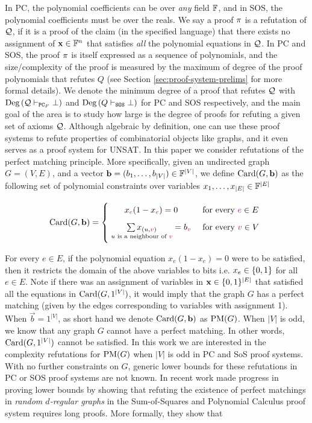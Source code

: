 \documentclass[11pt]{article}
\begin{document}
In PC, the polynomial coefficients can be over \emph{any} field $\mathbb{F}$, and in SOS, the polynomial coefficients must be over the reals.
We say a proof $\pi$ is a refutation of $\mathcal{Q}$, if it is a proof of the claim (in the specified language) that there exists no assignment of $\mathbf{x} \in \mathbb{F}^n$ that satisfies \emph{all} the polynomial equations in $\mathcal{Q}$. 
In PC and SOS, the proof $\pi$ is itself expressed as a sequence of polynomials, and 
the size/complexity of the proof is measured by the maximum of degree of the proof polynomials that refutes $Q$ (see Section \ref{sec:proof-system-prelims} for more formal details).
We denote the minimum degree of a proof that refutes $\mathcal{Q}$ with $\text{Deg}\left(\mathcal{Q} \vdash_{\texttt{PC}_F} \bot\right)$ and $\text{Deg}\left(Q \vdash_{\texttt{SOS}} \bot\right)$ for PC and SOS respectively, and the main goal of the area is to study how large is the degree of proofs for refuting a given set of axioms $\mathcal{Q}$.
Although algebraic by definition, one can use these proof systems to refute properties of combinatorial objects like graphs, and it even serves as a proof system for UNSAT.
In this paper we consider refutations of the perfect matching principle.
More specifically, given an undirected graph $G=(V,E)$, and a vector $\mathbf{b} = (b_1, \dots, b_{|V|})  \in \mathbb{F}^{|V|}$, we define $\text{Card}(G, \mathbf{b})$ as the following set of polynomial constraints over variables $x_1, \dots, x_{|E|} \in \mathbb{F}^{|E|}$

\[
        \Card{G, \vec{b}}=
        \Bigger[10]\{\begin{array}{@{}cl}
                x_{\highlight{e}}(1 - x_{\highlight{e}}) = 0 & \text{ for every $\highlight{e} \in E$}\\[3mm]
                \underset{u \text{ is a neighbour of }\highlight{v}}{\sum x_{(u,\highlight{v})}}= b_{\highlight{v}} & \text{ for every $\highlight{v} \in V$} \\[3mm]
        \end{array}
\]

For every $e \in E$, if the polynomial equation $x_e(1 - x_e) = 0$ were to be satisfied, then it restricts the domain of the above variables to bits i.e. $x_e \in \{0,1\}$ for all $e \in E$.
Note if there was an assignment of variables in $\mathbf{x} \in \{0,1\}^{|E|}$ that satisfied all the equations in $\text{Card}(G, 1^{|V|})$, it would imply that the graph $G$ has a perfect matching (given by the edges corresponding to variables with assignment 1).  
When $\vec{b} = 1^{|V|}$, as short hand we denote $\text{Card}(G, \mathbf{b})$ as $\text{PM}(G)$.
When $|V|$ is odd, we know that any graph $G$ cannot have a perfect matching.
In other words, $\text{Card}(G, 1^{|V|})$ cannot be satisfied.
In this work we are interested in the complexity refutations for $\text{PM}(G)$  when $|V|$ is odd in PC and SoS proof systems.
With no further constraints on $G$, generic lower bounds for these refutations in PC or SOS proof systems are not known.
In recent work \citet{Austrin_2022} made progress in proving lower bounds by showing that refuting the existence of perfect matchings in \emph{random $d$-regular graphs} in the Sum-of-Squares and Polynomial Calculus proof system requires long proofs.
More formally, they show that 
\end{document}
